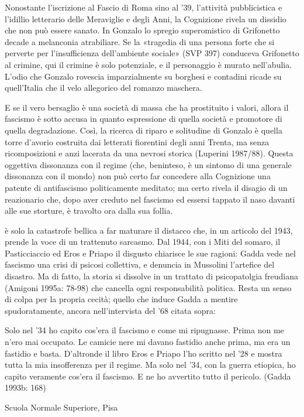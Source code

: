 Nonostante l’iscrizione al Fascio di Roma sino al ’39, l’attività pubblicistica e l’idillio letterario delle Meraviglie e degli Anni, la Cognizione rivela un dissidio che non può essere sanato. In Gonzalo lo spregio superomistico di Grifonetto decade a melanconia atrabiliare. Se la «tragedia di una persona forte che si perverte per l’insufficienza dell’ambiente sociale» (SVP 397) conduceva Grifonetto al crimine, qui il crimine è solo potenziale, e il personaggio è murato nell’abulia. L’odio che Gonzalo rovescia imparzialmente su borghesi e contadini ricade su quell’Italia che il velo allegorico del romanzo maschera.

E se il vero bersaglio è una società di massa che ha prostituito i valori, allora il fascismo è sotto accusa in quanto espressione di quella società e promotore di quella degradazione. Così, la ricerca di riparo e solitudine di Gonzalo è quella torre d’avorio costruita dai letterati fiorentini degli anni Trenta, ma senza ricomposizioni e anzi lacerata da una nevrosi storica (Luperini 1987/88). Questa oggettiva dissonanza con il regime (che, beninteso, è un sintomo di una generale dissonanza con il mondo) non può certo far concedere alla Cognizione una patente di antifascismo politicamente meditato; ma certo rivela il disagio di un reazionario che, dopo aver creduto nel fascismo ed essersi tappato il naso davanti alle sue storture, è travolto ora dalla sua follia.

è solo la catastrofe bellica a far maturare il distacco che, in un articolo del 1943, prende la voce di un trattenuto sarcasmo. Dal 1944, con i Miti del somaro, il Pasticciaccio ed Eros e Priapo il disgusto chiarisce le sue ragioni: Gadda vede nel fascismo una crisi di psicosi collettiva, e denuncia in Mussolini l’artefice del disastro. Ma di fatto, la storia si dissolve in un trattato di psicopatolgia freudiana (Amigoni 1995a: 78-98) che cancella ogni responsabilità politica. Resta un senso di colpa per la propria cecità; quello che induce Gadda a mentire spudoratamente, ancora nell’intervista del ’68 citata sopra:

Solo nel ’34 ho capito cos’era il fascismo e come mi ripugnasse. Prima non me n’ero mai occupato. Le camicie nere mi davano fastidio anche prima, ma era un fastidio e basta. D’altronde il libro Eros e Priapo l’ho scritto nel ’28 e mostra tutta la mia insofferenza per il regime. Ma solo nel ’34, con la guerra etiopica, ho capito veramente cos’era il fascismo. E ne ho avvertito tutto il pericolo. (Gadda 1993b: 168)

Scuola Normale Superiore, Pisa
